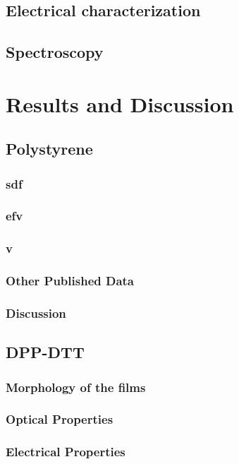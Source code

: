 \documentclass  [
  paper    = a4,
  BCOR     = 10mm,
  twoside,
  fontsize = 12pt,
  fleqn,
  toc      = bibnumbered,
  toc      = listofnumbered,
  numbers  = noendperiod,
  headings = normal,
  listof   = leveldown,
  version  = 3.03
]                                       {scrreprt}
\begin{document}
	\section{Electrical characterization}
	\section{Spectroscopy}
	
  \newpage
  \chapter{Results and Discussion}\label{cha:results}
	\section{Polystyrene}
		\subsection{sdf}
		\subsection{efv}
		\subsection{v}
		\subsection{Other Published Data}
		\subsection{Discussion}
	
	\section{DPP-DTT}
		\subsection{Morphology of the films}
		\subsection{Optical Properties}
		\subsection{Electrical Properties}
\end{document}

